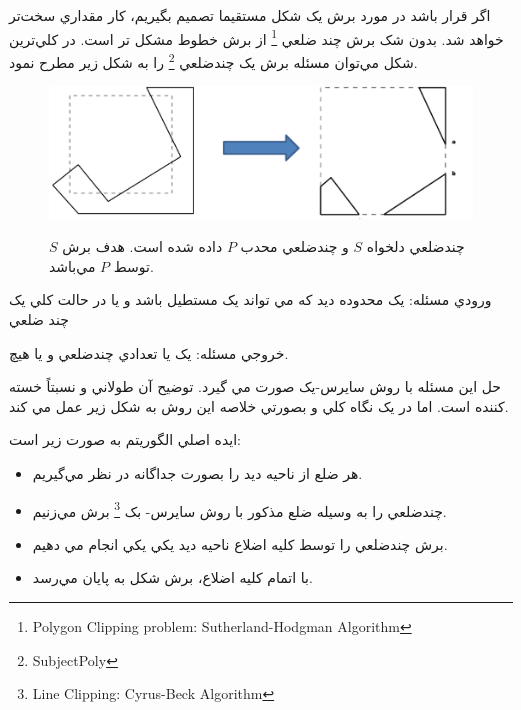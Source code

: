 \documentclass{book}
\begin{document}
اگر قرار باشد در مورد برش يک شکل مستقيما تصميم بگيريم، کار مقداري سخت‌تر خواهد شد. بدون شک برش چند ضلعي \footnote{ Polygon Clipping problem: Sutherland-Hodgman Algorithm}
از برش خطوط مشکل تر است. در کلي‌ترين شکل مي‌توان مسئله برش يک چندضلعي \footnote{SubjectPoly}
را به شکل زير مطرح نمود.

\begin{figure}[h!]
    \begin{center}
        \includegraphics[width=\linewidth]{pol_clip.png}
        \label{pol_clip}
        \caption{چندضلعي دلخواه $S$ و چندضلعي محدب $P$ داده شده است. هدف برش $S$ توسط $P$ مي‌باشد.}
    \end{center}
\end{figure}

ورودي مسئله: يک محدوده ديد که مي تواند يک مستطيل باشد و يا در حالت کلي يک چند ضلعي 

خروجي مسئله: يک يا تعدادي چندضلعي و يا هيچ.

حل اين مسئله با روش سايرس-يک صورت مي گيرد. توضيح آن طولاني و نسبتاً خسته کننده است. اما در يک نگاه کلي و بصورتي خلاصه اين روش به شکل زير عمل مي کند.

ايده اصلي الگوريتم به صورت زير است:

\begin{itemize}
    \item
    هر ضلع از ناحيه ديد را بصورت جداگانه در نظر مي‌گيريم.
    \item
    چندضلعي را به وسيله ضلع مذکور با روش سايرس- بک \footnote{ Line Clipping: Cyrus-Beck Algorithm} برش مي‌زنيم.
    \item
    برش چندضلعي را توسط کليه اضلاع ناحيه ديد يکي يکي انجام مي دهيم.
    \item
    با اتمام کليه اضلاع، برش شکل به پايان مي‌رسد.
\end{itemize}
\end{document}
